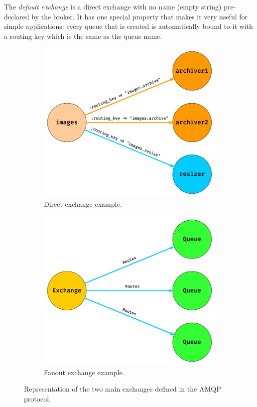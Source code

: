 The \emph{default exchange} is a direct exchange with no name (empty string) pre-declared by the broker. It has one special property that makes it
very useful for simple applications: every queue that is created is automatically bound to it with a routing key which is the same as the queue name.

\begin{figure}[ht]
	\centering
	\begin{subfigure}{.45\textwidth}
		\centering
		\includegraphics[width=\linewidth]{figures/direct-exchange.pdf}
		\caption{Direct exchange example.}
		\label{fig:direc-exchange}
	\end{subfigure}
	\begin{subfigure}{.45\textwidth}
		\centering
		\includegraphics[width=\linewidth]{figures/fanout-exchange.pdf}
		\caption{Fanout exchange example.}
		\label{fig:fanout-exchange}
	\end{subfigure}
	\caption[Main exchange in the AMQP protocol]{Representation of the two main exchanges defined in the AMQP protocol.}
	\label{fig:amqp-exhange-type}
\end{figure}

